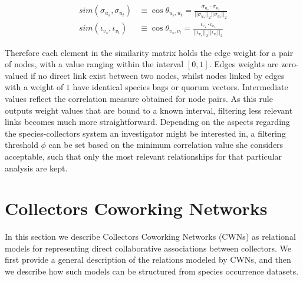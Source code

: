 {\begin{equation}
\begin{split}
sim(\sigma_{u_s},\sigma_{u_t}) &\equiv
\cos \theta_{u_s,u_t} =
\frac{  \sigma_{u_s} \cdot \sigma_{u_t}  }{  ||\sigma_{u_s}||_2  ||\sigma_{u_t}||_2  } \\
sim(\iota_{v_s},\iota_{v_t}) &\equiv
\cos \theta_{v_s,v_t} =
\frac{  \iota_{v_s} \cdot \iota_{v_t}  }{  ||\iota_{v_s}||_2  ||\iota_{v_t}||_2  } 
\end{split}
\end{equation}

Therefore each element in the similarity matrix holds the edge weight for a pair of nodes, with a value ranging within the interval $[0,1]$. Edges weights are zero-valued if no direct link exist between two nodes,  whilst nodes linked by edges with a weight of $1$ have identical species bags or quorum vectors. Intermediate values reflect the correlation measure obtained for node pairs.
As this rule outputs weight values that are bound to a known interval, filtering less relevant links becomes much more straightforward. Depending on the aspects regarding the species-collectors system an investigator might be interested in, a filtering threshold $\phi$ can be set based on the minimum correlation value she considers acceptable, such that only the most relevant relationships for that particular analysis are kept.













\section{Collectors Coworking Networks}
In this section we describe Collectors Coworking Networks (CWNs) as relational models for representing direct collaborative associations between collectors.
We first provide a general description of the relations modeled by CWNs, and then we describe how such models can be structured from species occurrence datasets.

}
